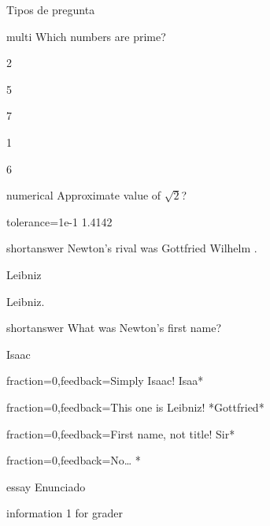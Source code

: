 \documentclass[10pt]{article}
\begin{document}
\begin{quiz}{Tipos de pregunta}

\begin{multi}[]%
    {multi}
    Which numbers are prime? 
    \item* 2 
    \item* 5 
    \item* 7 
    \item 1 
    \item 6 
\end{multi}



\begin{numerical}[tolerance=0.01]%
    {numerical} 
    Approximate value of $\sqrt{2}$? 
    \item[tolerance={1e-1}] 1.4142
\end{numerical}


\begin{shortanswer}%
    {shortanswer}
    Newton's rival was Gottfried Wilhelm \blank. 
    \item Leibniz 
    \item Leibniz. 
\end{shortanswer}

\begin{shortanswer}[usecase]%
    {shortanswer}
    What was Newton's first name? 
    \item Isaac 
    \item[fraction=0,feedback={Simply Isaac!}] Isaa* 
    \item[fraction=0,feedback={This one is Leibniz!}] *Gottfried* 
    \item[fraction=0,feedback={First name, not title!}] Sir* 
    \item[fraction=0,feedback={No\dots}] * 
\end{shortanswer}

\begin{essay}[]%
    {essay} 
    Enunciado
    \item information 1 for grader 
\end{essay}


\end{quiz}
\end{document}
